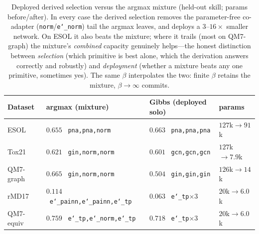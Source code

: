 \documentclass[11pt]{article}
\newcommand{\allowbreakhere}{\discretionary{}{}{}}
\newcommand{\code}[1]{\texttt{\def\_{\char`_\allowbreakhere}#1}}
\begin{document}
\begin{table}[h]
\centering
\small
\renewcommand{\arraystretch}{1.2}
\begin{tabular}{p{2.6cm} p{3.6cm} p{3.6cm} p{2.4cm}}
\toprule
\textbf{Dataset} & \textbf{argmax (mixture)} & \textbf{Gibbs (deployed solo)} & \textbf{params}\\
\midrule
ESOL      & $0.655$ \ \code{pna,pna,norm}      & $\mathbf{0.663}$ \ \code{pna,pna,pna}  & $127$k$\to91$k\\
Tox21     & $0.621$ \ \code{gin,norm,norm}     & $0.601$ \ \code{gcn,gcn,gcn}           & $127$k$\to\mathbf{7.9}$k\\
QM7-graph & $\mathbf{0.665}$ \ \code{gin,norm,norm} & $0.504$ \ \code{gin,gin,gin}      & $126$k$\to14$k\\
rMD17     & $\mathbf{0.114}$ \ \code{e\_painn,e\_painn,e\_tp} & $0.063$ \ \code{e\_tp}$\times3$ & $20$k$\to\mathbf{6.0}$k\\
QM7-equiv & $\mathbf{0.759}$ \ \code{e\_tp,e\_norm,e\_tp} & $0.718$ \ \code{e\_tp}$\times3$ & $20$k$\to\mathbf{6.0}$k\\
\bottomrule
\end{tabular}
\caption{Deployed derived selection versus the argmax mixture (held-out skill; params before/after).
In every case the derived selection removes the parameter-free co-adapter (\code{norm}/\code{e\_norm})
tail the argmax leaves, and deploys a $3$--$16\times$ smaller network. On ESOL it also beats the mixture;
where it trails (most on QM7-graph) the mixture's \emph{combined} capacity genuinely helps---the honest
distinction between \emph{selection} (which primitive is best alone, which the derivation answers
correctly and robustly) and \emph{deployment} (whether a mixture beats any one primitive, sometimes yes).
The same $\beta$ interpolates the two: finite $\beta$ retains the mixture, $\beta\to\infty$ commits.}
\label{tab:gibbs-deploy}
\end{table}
\end{document}
